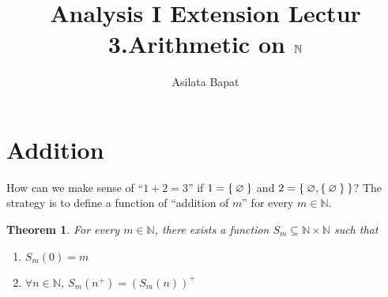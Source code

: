 \documentclass[12pt]{amsart}
\title[Arithmetic on $\bbN$]
	{Analysis I Extension Lectur\\3.Arithmetic on $\bbN$}
\author{Asilata Bapat}
\newcommand{\bbN}{\mathbb{N}}
\theoremstyle{plain}
\newtheorem*{thm}{Theorem}
\theoremstyle{remark}
\theoremstyle{definition}
\begin{document}
\maketitle
{}

\section*{Addition}
How can we make sense of ``$1+2 = 3$'' if $1 = \Set{\varnothing}$ and $2 = \Set{\varnothing, \Set{\varnothing}}$?
The strategy is to define a function of ``addition of $m$'' for every $m \in \bbN$. 

\begin{thm}
	For every $m \in \bbN$, there exists a function $S_m \subseteq \bbN \times \bbN$ such that 
	\begin{enumerate}[(1)]
		\item 
			$S_m(0) = m$
		\item 
			$\forall n \in \bbN$, $S_m(n^+) = (S_m(n))^+$
	\end{enumerate}
\end{thm}
\end{document}

